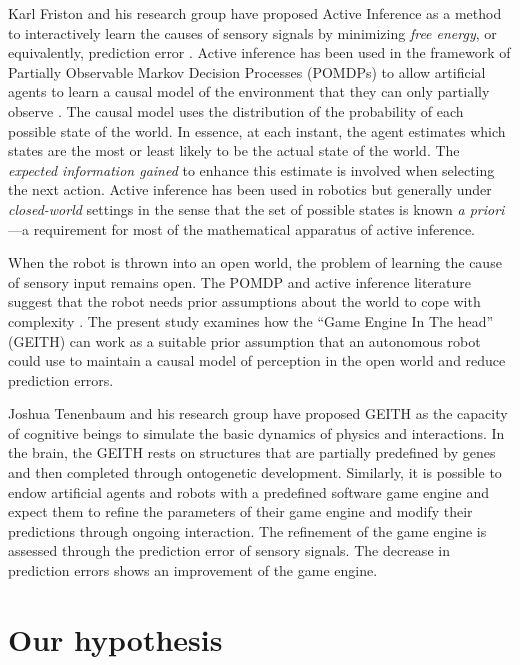 \documentclass[runningheads]{llncs}
\begin{document}
Karl Friston and his research group have proposed Active Inference as a method to interactively learn the causes of sensory signals by minimizing \textit{free energy}, or equivalently, prediction error \cite{friston_free-energy_2010}.
Active inference has been used in the framework of Partially Observable Markov Decision Processes (POMDPs) to allow artificial agents to learn a causal model of the environment that they can only partially observe \cite{smith_step-by-step_2022}. 
The causal model uses the distribution of the probability of each possible state of the world. 
In essence, at each instant, the agent estimates which states are the most or least likely to be the actual state of the world.
The \textit{expected information gained} to enhance this estimate is involved when selecting the next action.
Active inference has been used in robotics \cite{lanillos_active_2021} but generally under \textit{closed-world} settings in the sense that the set of possible states is known \textit{a priori}---a requirement for most of the mathematical apparatus of active inference. 

When the robot is thrown into an open world, the problem of learning the cause of sensory input remains open. 
The POMDP and active inference literature suggest that the robot needs prior assumptions about the world to cope with complexity \cite{georgeon_artificial_2024}. 
The present study examines how the ``Game Engine In The head'' (GEITH) can work as a suitable prior assumption that an autonomous robot could use to maintain a causal model of perception in the open world and reduce prediction errors. 

Joshua Tenenbaum and his research group have proposed GEITH \cite{ullman_mind_2017} as the capacity of cognitive beings to simulate the basic dynamics of physics and interactions. 
In the brain, the GEITH rests on structures that are partially predefined by genes and then completed through ontogenetic development.  
Similarly, it is possible to endow artificial agents and robots with a predefined software game engine and expect them to refine the parameters of their game engine and modify their predictions through ongoing interaction.
The refinement of the game engine is assessed through the prediction error of sensory signals. 
The decrease in prediction errors shows an improvement of the game engine. 




\section{Our hypothesis}
\end{document}
